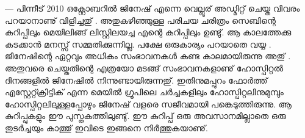 ---
പിന്നീട് 2010 ഒക്റ്റോബറില്‍ ജിനേഷ് എന്നെ വെല്ലൂര് അഡ്മിറ്റ് ചെയ്ത വിവരം പറയാനാണു് വിളിച്ചതു് . അതുകഴിഞ്ഞുള്ള പരിചയ ചരിത്രം സെബിന്റെ കുറിപ്പിലും മെയിലിങ്ങ് ലിസ്റ്റിലയച്ച എന്റെ കുറിപ്പിലും ഉണ്ടു്. ആ കാലത്തേക്കു കടക്കാന്‍ മനസ്സ് സമ്മതിക്കുന്നില്ല. പക്ഷേ ഒരുകാര്യം പറയാതെ വയ്യ . ജിനേഷിന്റെ ഏറ്റവും അധികം സംഭാവനകള്‍ കണ്ട കാലമായിരുന്നു അതു് . അതുവരെ ചെയ്തതിന്റെ എത്രയോ മടങ്ങ് സംഭാവനകളാണു് ഹോസ്പിറ്റല്‍ ദിനങ്ങളില്‍ ജിനേഷില്‍ നിന്നുണ്ടായിരുന്നതു്. ഇതിനുമപ്പുറം ഫോര്‍ത്ത് എസ്റ്റേറ്റ്ക്രിട്ടിക് എന്ന മെയില്‍ ഗ്രൂപിലെ ചര്‍ച്ചകളിലും ഹോസ്പിറ്റലിനുമുമ്പും ഹോസ്പിറ്റലിലുള്ളപ്പോഴും ജിനേഷ് വളരെ സജീവമായി പങ്കെടുത്തിരുന്നു. ആ കുറിപ്പുകളും ഈ പുസ്തകത്തിലുണ്ടു്. ഈ കുറിപ്പ് ഒരു അവസാനമില്ലാതെ ഒരു തുടര്‍ച്ചയും കാത്തു് ഇവിടെ ഇങ്ങനെ നിര്‍ത്തുകയാണു്. 

